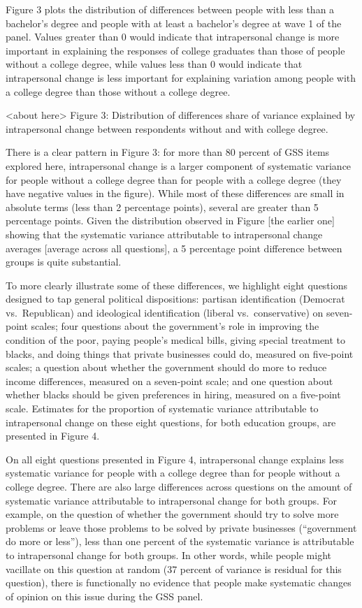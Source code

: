 \documentclass[
  11pt,
]{article}
\begin{document}
Figure 3 plots the distribution of differences between people with less
than a bachelor's degree and people with at least a bachelor's degree at
wave 1 of the panel. Values greater than 0 would indicate that
intrapersonal change is more important in explaining the responses of
college graduates than those of people without a college degree, while
values less than 0 would indicate that intrapersonal change is less
important for explaining variation among people with a college degree
than those without a college degree.

\begin{center}
<about here>
Figure 3: Distribution of differences share of variance explained by intrapersonal change between respondents without and with college degree.
\end{center}

There is a clear pattern in Figure 3: for more than 80 percent of GSS
items explored here, intrapersonal change is a larger component of
systematic variance for people without a college degree than for people
with a college degree (they have negative values in the figure). While
most of these differences are small in absolute terms (less than 2
percentage points), several are greater than 5 percentage points. Given
the distribution observed in Figure {[}the earlier one{]} showing that
the systematic variance attributable to intrapersonal change averages
{[}average across all questions{]}, a 5 percentage point difference
between groups is quite substantial.

To more clearly illustrate some of these differences, we highlight eight
questions designed to tap general political dispositions: partisan
identification (Democrat vs.~Republican) and ideological identification
(liberal vs.~conservative) on seven-point scales; four questions about
the government's role in improving the condition of the poor, paying
people's medical bills, giving special treatment to blacks, and doing
things that private businesses could do, measured on five-point scales;
a question about whether the government should do more to reduce income
differences, measured on a seven-point scale; and one question about
whether blacks should be given preferences in hiring, measured on a
five-point scale. Estimates for the proportion of systematic variance
attributable to intrapersonal change on these eight questions, for both
education groups, are presented in Figure 4.

On all eight questions presented in Figure 4, intrapersonal change
explains less systematic variance for people with a college degree than
for people without a college degree. There are also large differences
across questions on the amount of systematic variance attributable to
intrapersonal change for both groups. For example, on the question of
whether the government should try to solve more problems or leave those
problems to be solved by private businesses (``government do more or
less''), less than one percent of the systematic variance is
attributable to intrapersonal change for both groups. In other words,
while people might vacillate on this question at random (37 percent of
variance is residual for this question), there is functionally no
evidence that people make systematic changes of opinion on this issue
during the GSS panel.
\end{document}
